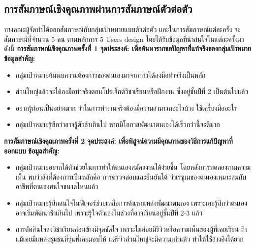 \subsection{การสัมภาษณ์เชิงคุณภาพผ่านการสัมภาษณ์ตัวต่อตัว}
ทางคณะผู้จัดทำได้ออกสัมภาษณ์กับกลุ่มเป้าหมายแบบตัวต่อตัว และในการสัมภาษณ์แต่ละครั้ง จะสัมภาษณ์ที่จำนวน 5 คน ตามหลักการ 5 Users design โดยได้รับข้อมูลที่น่าสนใจในแต่ละครั้งมาดังนี้
\newline
\textbf{การสัมภาษณ์เชิงคุณภาพครั้งที่ 1}
\newline
\textbf{จุดประสงค์: เพื่อค้นหารากขอปัญหาที่แท้จริงของกลุ่มเป้าหมาย}
\newline
\textbf{ข้อมูลสำคัญ: }
\begin{itemize}
    \item กลุ่มเป้าหมายค้นพบความต้องการของตนเองมาจากการได้ลงมือทำจริงเป็นหลัก
    \item ส่วนใหญ่แล้วจะได้ลงมือทำจริงตอนโปรเจ็กต์วิชาเรียนหรือฝึกงาน ซึ่งอยู่ชั้นปีที่ 2 เป็นต้นไปแล้ว
    \item อยากรู้ก่อนเป็นอย่างมาก ว่าในการทำงานจริงต้องมีความสามารถอะไรบ้าง ใช้เครื่องมืออะไร
    \item กลุ่มเป้าหมายรู้สึกว่าอาจรู้ตัวช้าเกินไป หากมีโอกาสพัฒนาตนเองได้เร็วกว่านี้จะดีมาก
\end{itemize}


\noindent\textbf{การสัมภาษณ์เชิงคุณภาพครั้งที่ 2}
\newline
\textbf{จุดประสงค์: เพื่อพิสูจน์ความมีคุณภาพของวิธีการแก้ปัญหาที่ออกแบบ}
\newline
\textbf{ข้อมูลสำคัญ: }
\begin{itemize}
    \item กลุ่มเป้าหมายอยากได้ตัวช่วยในการทำให้ตนเองสมัครงานได้ง่ายขึ้น โดยหลังการทดลองถามความเห็น พบว่าสิ่งที่ต้องการเป็นหลักคือ การตรวจสอบและยืนยันได้ ว่าเรซูเมของตนเองเหมาะสมกับอาชีพที่ตนเองสนใจขนาดไหนแล้ว
    \item กลุ่มเป้าหมายรู้สึกสนใจในฟีเจอร์ช่วยเหลือการค้นหาแหล่งพัฒนาตนเอง เพราะเคยรู้สึกว่าตนเองอาจเริ่มพัฒนาช้าเกินไป เพราะรู้ใจตัวเองในช่วงที่อาจเรียนอยู่ชั้นปีที่ 2-3 แล้ว
    \item การตัดสินใจลงวิชาเรียนค่อนข้างมีจุดขัดใจ เพราะไม่ค่อยมีรีวิวหรือความเห็นของผู้ที่เคยเรียน ถึงแม้เคยมีแหล่งชุมชนที่รุ่นพี่เคยมอบให้ แต่รีวิวส่วนใหญ่จะมีความเก่าแล้ว ทำให้ใช้อ้างอิงได้ยาก
\end{itemize}


